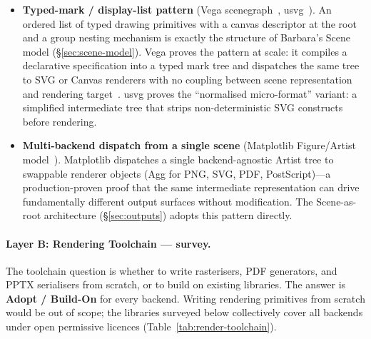 \begin{itemize}
  \item \textbf{Typed-mark / display-list pattern}
        (Vega scenegraph~\cite{vega-scenegraph}, usvg~\cite{usvg}).
        An ordered list of typed drawing primitives with a canvas descriptor at the
        root and a group nesting mechanism is exactly the structure of Barbara's Scene
        model (\S\ref{sec:scene-model}).
        Vega proves the pattern at scale: it compiles a declarative specification into
        a typed mark tree and dispatches the same tree to SVG or Canvas renderers with
        no coupling between scene representation and rendering
        target~\cite{vegalite2017}.
        usvg proves the ``normalised micro-format'' variant: a simplified intermediate
        tree that strips non-deterministic SVG constructs before rendering.

  \item \textbf{Multi-backend dispatch from a single scene}
        (Matplotlib Figure/Artist model~\cite{matplotlib}).
        Matplotlib dispatches a single backend-agnostic Artist tree to swappable
        renderer objects (Agg for PNG, SVG, PDF, PostScript)---a production-proven
        proof that the same intermediate representation can drive fundamentally
        different output surfaces without modification.
        The Scene-as-root architecture (\S\ref{sec:outputs}) adopts this pattern
        directly.
\end{itemize}

\paragraph{Layer B: Rendering Toolchain --- survey.}
The toolchain question is whether to write rasterisers, PDF generators, and PPTX
serialisers from scratch, or to build on existing libraries.
The answer is \textbf{Adopt / Build-On} for every backend.
Writing rendering primitives from scratch would be out of scope; the libraries
surveyed below collectively cover all backends under open permissive licences
(Table~\ref{tab:render-toolchain}).

